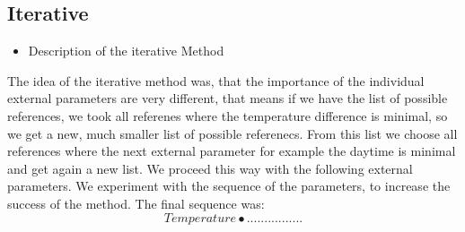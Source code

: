 \documentclass  [
  paper    = a4,
  BCOR     = 10mm,
  twoside,
  fontsize = 12pt,
  fleqn,
  toc      = bibnumbered,
  toc      = listofnumbered,
  numbers  = noendperiod,
  headings = normal,
  listof   = leveldown,
  version  = 3.03
]                                       {scrreprt}
\begin{document}
	\subsection{Iterative}
	\begin{itemize}
		\item Description of the iterative Method
	\end{itemize}
	The idea of the iterative method was, that the importance of the individual external parameters are very different, that means if we have the list of possible references, we took all referenes where the temperature difference is minimal, so we get a new, much smaller list of possible referenecs. From this list we choose all references where the next external parameter for example the daytime is minimal and get again a new list. We proceed this way with the following external parameters. We experiment with the sequence of the parameters, to increase the success of the method. The final sequence was:
	\begin{equation*}
	Temperature \bullet ................
	\end{equation*} 
	
\end{document}
